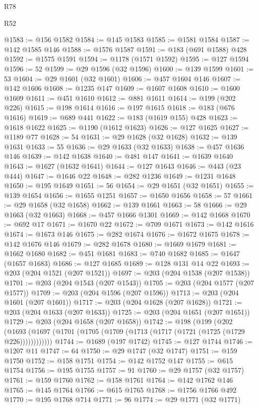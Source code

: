 \begin{lexlean}{R78}
\begin{lexlean}{R52}
\begin{coremodule}
{{{{{{{{{{{{{{{{{{{{{{{{{{{{{{{{{{{{{{{{{{{{{{{{{{{{{{{{{{{{{{{{{{{{{{{{{{{{{{{{{{{{{{{{{{{{{{{{{{{{{{{{{{{{{{{{{{{{{{{{{{{{{{{{{{{{{{{{{{{{{{{{{{{{{{{{{{{{{{{{{{{{{{{{{{{{{{{{{{{{{{{{{{{{{{{{{{{{{{@1583 := @156 @1582
@1584 := @145 @1583
@1585 := @1581 @1584
@1587 := @142 @1585 @146
@1588 := @1576 @1587
@1591 := @183 (@691 @1588) @428
@1592 := @1575 @1591
@1594 := @1178 (@1571 @1592)
@1595 := @127 @1594
@1596 := 52
@1599 := @29 @1596 (@32 @1596)
@1600 := @139 @1599
@1601 := 53
@1604 := @29 @1601 (@32 @1601)
@1606 := @457 @1604 @146
@1607 := @142 @1606
@1608 := @1235 @147
@1609 := @1607 @1608
@1610 := @1600 @1609
@1611 := @451 @1610
@1612 := @881 @1611
@1614 := @199 (@202 @226)
@1615 := @198 @1614
@1616 := @197 @1615
@1618 := @183 (@676 @1616)
@1619 := @689 @441
@1622 := @183 (@1619 @155) @428
@1623 := @1618 @1622
@1625 := @1190 (@1612 @1623)
@1626 := @127 @1625
@1627 := @1189 @77
@1628 := 54
@1631 := @29 @1628 (@32 @1628)
@1632 := @139 @1631
@1633 := 55
@1636 := @29 @1633 (@32 @1633)
@1638 := @457 @1636 @146
@1639 := @142 @1638
@1640 := @481 @147
@1641 := @1639 @1640
@1643 := @1627 (@1632 @1641)
@1644 := @127 @1643
@1646 := @443 (@23 @444)
@1647 := @1646 @22
@1648 := @282 @1236
@1649 := @1231 @1648
@1650 := @195 @1649
@1651 := 56
@1654 := @29 @1651 (@32 @1651)
@1655 := @139 @1654
@1656 := @1655 @1251
@1657 := @1650 @1656
@1658 := 57
@1661 := @29 @1658 (@32 @1658)
@1662 := @139 @1661
@1663 := 58
@1666 := @29 @1663 (@32 @1663)
@1668 := @457 @1666 @1301
@1669 := @142 @1668
@1670 := @692 @17
@1671 := @1670 @22
@1672 := @709 @1671
@1673 := @142 @1616
@1674 := @1673 @146
@1675 := @282 @1674
@1676 := @1672 @1675
@1678 := @142 @1676 @146
@1679 := @282 @1678
@1680 := @1669 @1679
@1681 := @1662 @1680
@1682 := @451 @1681
@1683 := @740 @1682
@1685 := @1647 (@1657 @1683)
@1686 := @127 @1685
@1689 := @128 @131 @14 @22
@1693 := @203 (@204 @1521 (@207 @1521))
@1697 := @203 (@204 @1538 (@207 @1538))
@1701 := @203 (@204 @1543 (@207 @1543))
@1705 := @203 (@204 @1577 (@207 @1577))
@1709 := @203 (@204 @1596 (@207 @1596))
@1713 := @203 (@204 @1601 (@207 @1601))
@1717 := @203 (@204 @1628 (@207 @1628))
@1721 := @203 (@204 @1633 (@207 @1633))
@1725 := @203 (@204 @1651 (@207 @1651))
@1729 := @203 (@204 @1658 (@207 @1658))
@1742 := @198
    (@199
      (@202 (@1693 (@1697 (@1701 (@1705 (@1709 (@1713 (@1717 (@1721 (@1725 (@1729 @226))))))))))))
@1744 := @1689 (@197 @1742)
@1745 := @127 @1744
@1746 := @1207 @11
@1747 := 64
@1750 := @29 @1747 (@32 @1747)
@1751 := @159 @1750
@1752 := @158 @1751
@1754 := @142 @1752 @147
@1755 := @615 @1754
@1756 := @195 @1755
@1757 := 91
@1760 := @29 @1757 (@32 @1757)
@1761 := @159 @1760
@1762 := @158 @1761
@1764 := @142 @1762 @146
@1765 := @145 @1764
@1766 := @615 @1765
@1768 := @1756 @1766 @492
@1770 := @195 @1768 @714
@1771 := 96
@1774 := @29 @1771 (@32 @1771)
}}}}}}}}}}}}}}}}}}}}}}}}}}}}}}}}}}}}}}}}}}}}}}}}}}}}}}}}}}}}}}}}}}}}}}}}}}}}}}}}}}}}}}}}}}}}}}}}}}}}}}}}}}}}}}}}}}}}}}}}}}}}}}}}}}}}}}}}}}}}}}}}}}}}}}}}}}}}}}}}}}}}}}}}}}}}}}}}}}}}}}}}}}}}}}}}}}}}}}
\end{coremodule}
\end{lexlean}
\end{lexlean}
